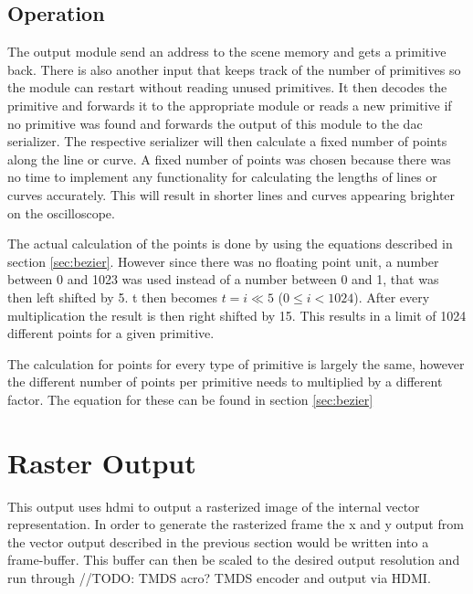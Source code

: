\subsection{Operation}

The output module send an address to the scene memory and gets a primitive back.
There is also another input that keeps track of the number of primitives so the module can restart without reading unused primitives.
It then decodes the primitive and forwards it to the appropriate module or reads a new primitive if no primitive was found and forwards the output of this module to the \gls{dac} serializer.
The respective serializer will then calculate a fixed number of points along the line or curve.
A fixed number of points was chosen because there was no time to implement any functionality for calculating the lengths of lines or curves accurately.
This will result in shorter lines and curves appearing brighter on the oscilloscope.

The actual calculation of the points is done by using the equations described in section \ref{sec:bezier}.
However since there was no floating point unit, a number between 0 and 1023 was used instead of a number between 0 and 1, that was then left shifted by 5.
t then becomes \(t = i \ll 5\) (\(0 \leq i < 1024\)).
After every multiplication the result is then right shifted by 15.
This results in a limit of 1024 different points for a given primitive.

The calculation for points for every type of primitive is largely the same, however the different number of points per primitive needs to multiplied by a different factor.
The equation for these can be found in section \ref{sec:bezier}

\section{Raster Output}

This output uses \gls{hdmi} to output a rasterized image of the internal vector representation.
In order to generate the rasterized frame the x and y output from the vector output described in the previous section would be written into a frame-buffer.
This buffer can then be scaled to the desired output resolution and run through //TODO: TMDS acro? TMDS encoder and output via HDMI.
